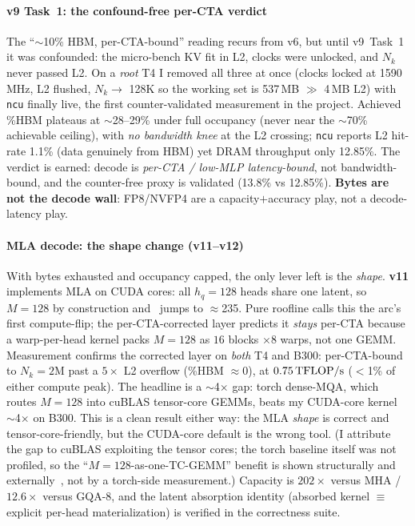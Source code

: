 \paragraph{v9 Task~1: the confound-free per-CTA verdict}
The ``$\sim$10\% HBM, per-CTA-bound'' reading recurs from v6, but until v9~Task~1
it was confounded: the micro-bench KV fit in L2, clocks were unlocked, and $N_k$
never passed L2. On a \emph{root} T4 I removed all three at once (clocks locked
at 1590\,MHz, L2 flushed, $N_k \to$ 128K so the working set is 537\,MB $\gg$ 4\,MB
L2) with \texttt{ncu} finally live, the first counter-validated measurement in
the project. Achieved \%HBM plateaus at $\sim$28--29\% under full occupancy (never
near the $\sim$70\% achievable ceiling), with \emph{no bandwidth knee} at the L2
crossing; \texttt{ncu} reports L2 hit-rate 1.1\% (data genuinely from HBM) yet
DRAM throughput only 12.85\%. The verdict is earned: decode is
\emph{per-CTA / low-MLP latency-bound}, not bandwidth-bound, and the counter-free
proxy is validated (13.8\% vs 12.85\%). \textbf{Bytes are not the decode wall}:
FP8/NVFP4 are a capacity$+$accuracy play, not a decode-latency play.

\paragraph{MLA decode: the shape change (v11--v12)}
With bytes exhausted and occupancy capped, the only lever left is the
\emph{shape}. \textbf{v11} implements MLA on CUDA cores: all $h_q{=}128$ heads
share one latent, so $M{=}128$ by construction and \ai\ jumps to $\approx$235.
Pure roofline calls this the arc's first compute-flip; the per-CTA-corrected
layer predicts it \emph{stays} per-CTA because a warp-per-head kernel packs
$M{=}128$ as $16$ blocks $\times 8$ warps, not one GEMM. Measurement confirms the
corrected layer on \emph{both} T4 and B300: per-CTA-bound to $N_k{=}2$M past a
$5\times$ L2 overflow (\%HBM $\approx 0$), at $0.75\,\text{TFLOP/s}$ ($<$1\% of either
compute peak). The headline is a $\sim$4$\times$ gap: torch dense-MQA, which
routes $M{=}128$ into cuBLAS tensor-core GEMMs, beats my CUDA-core kernel
$\sim$4$\times$ on B300. This is a clean result either way: the MLA \emph{shape}
is correct and tensor-core-friendly, but the CUDA-core default is the wrong tool.
(I attribute the gap to cuBLAS exploiting the tensor cores; the torch baseline
itself was not profiled, so the ``$M{=}128$-as-one-TC-GEMM'' benefit is shown
structurally and externally~\cite{gla}, not by a torch-side measurement.)
Capacity is $202\times$ versus MHA / $12.6\times$ versus GQA-8, and the latent
absorption identity (absorbed kernel $\equiv$ explicit per-head materialization)
is verified in the correctness suite.

